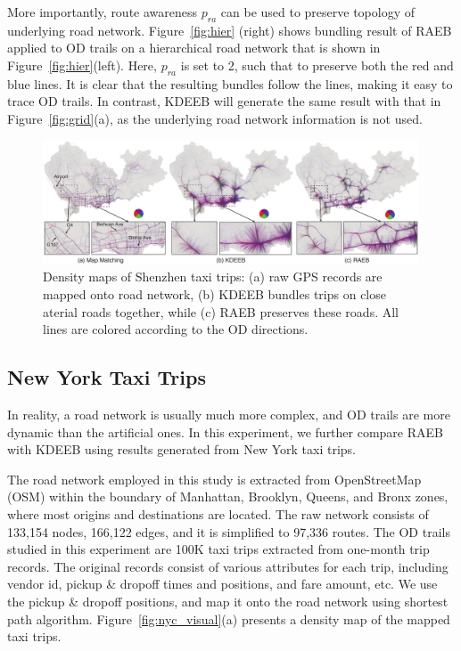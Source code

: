 More importantly, route awareness $p_{ra}$ can be used to preserve topology of underlying road network.
Figure~\ref{fig:hier} (right) shows bundling result of RAEB applied to OD trails on a hierarchical road network that is shown in Figure~\ref{fig:hier}(left).
Here, $p_{ra}$ is set to 2, such that to preserve both the red and blue lines.
It is clear that the resulting bundles follow the lines, making it easy to trace OD trails.
In contrast, KDEEB will generate the same result with that in Figure~\ref{fig:grid}(a), as the underlying road network information is not used.

\begin{figure}[t]
	\centering
	\includegraphics[width=0.995\textwidth]{figure/edgebundling/fig10_study3/shenzhen}
	\vspace{-2mm}
	\caption{
	Density maps of Shenzhen taxi trips: (a) raw GPS records are mapped onto road network, (b) KDEEB bundles trips on close aterial roads together, while (c) RAEB preserves these roads. All lines are colored according to the OD directions.
	}
	\label{fig:shenzhen}
	\vspace{-1mm}
\end{figure}

\subsection{New York Taxi Trips}
\label{ssec:study2}

In reality, a road network is usually much more complex, and OD trails are more dynamic than the artificial ones.
In this experiment, we further compare RAEB with KDEEB using results generated from New York taxi trips.

The road network employed in this study is extracted from OpenStreetMap (OSM) within the boundary of Manhattan, Brooklyn, Queens, and Bronx zones, where most origins and destinations are located.
The raw network consists of 133,154 nodes, 166,122 edges, and it is simplified to 97,336 routes.
The OD trails studied in this experiment are 100K taxi trips extracted from one-month trip records.
The original records consist of various attributes for each trip, including vendor id, pickup \& dropoff times and positions, and fare amount, etc.
We use the pickup \& dropoff positions, and map it onto the road network using shortest path algorithm.
Figure~\ref{fig:nyc_visual}(a) presents a density map of the mapped taxi trips.

